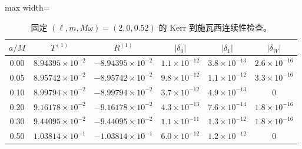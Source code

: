 \begin{table}[htbp]
\centering
\caption{固定 $(\ell,m,M\omega)=(2,0,0.52)$ 的 Kerr 到施瓦西连续性检查。}
\label{note-tab:spin-limit}
\begin{adjustbox}{max width=\textwidth}
\begin{tabular}{c c c c c c}
$a/M$ & $T^{(1)}$ & $R^{(1)}$ & $|\delta_0|$ & $|\delta_1|$ & $|\delta_W|$\\
\hline
0.00 & $8.94395\times10^{-2}$ & $-8.94395\times10^{-2}$ & $1.1\times10^{-12}$ & $3.8\times10^{-13}$ & $2.6\times10^{-16}$\\
0.05 & $8.95742\times10^{-2}$ & $-8.95742\times10^{-2}$ & $9.8\times10^{-12}$ & $1.1\times10^{-12}$ & $3.3\times10^{-16}$\\
0.10 & $8.99794\times10^{-2}$ & $-8.99794\times10^{-2}$ & $3.7\times10^{-12}$ & $4.9\times10^{-13}$ & $0$\\
0.20 & $9.16178\times10^{-2}$ & $-9.16178\times10^{-2}$ & $4.3\times10^{-13}$ & $7.6\times10^{-14}$ & $1.8\times10^{-16}$\\
0.30 & $9.44095\times10^{-2}$ & $-9.44095\times10^{-2}$ & $1.1\times10^{-11}$ & $1.3\times10^{-12}$ & $1.8\times10^{-16}$\\
0.50 & $1.03814\times10^{-1}$ & $-1.03814\times10^{-1}$ & $6.0\times10^{-12}$ & $1.2\times10^{-12}$ & $0$\\
\end{tabular}
\end{adjustbox}
\end{table}

